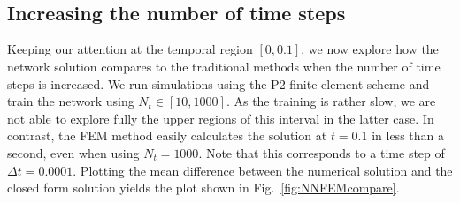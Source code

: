 \documentclass[a4paper, twocolumn]{article}
\newcommand{\fig}[1]{Fig.\ \ref{fig:#1}}
\begin{document}
\begin{figure}[p]
\centering
{} \\
 \\
\end{figure}


\subsection{Increasing the number of time steps}
Keeping our attention at the temporal region $[0,0.1]$, we now explore how the network solution compares to the traditional methods when the number of time steps is increased. We run simulations using the P2 finite element scheme and train the network using $N_t\in[10,1000]$. As the training is rather slow, we are not able to explore fully the upper regions of this interval in the latter case. In contrast, the FEM method easily calculates the solution at $t=0.1$ in less than a second, even when using $N_t=1000$. Note that this corresponds to a time step of $\Delta t=0.0001$. Plotting the mean difference between the numerical solution and the closed form solution yields the plot shown in \fig{NNFEMcompare}. 
\end{document}

